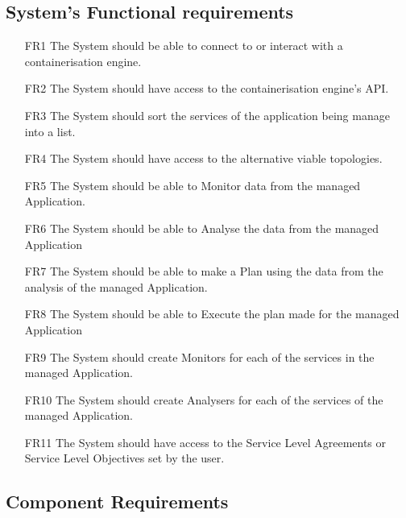 \subsection{{System's Functional requirements}}
\begin{itemize}
    \item [FR1] The System should be able to connect to or interact with a containerisation engine.
    \item [FR2] The System should have access to the containerisation engine's API.
    \item [FR3] The System should sort the services of the application being manage into a list.
    \item [FR4] The System should have access to the alternative viable topologies.
    \item [FR5] The System should be able to Monitor data from the managed Application.
     \item [FR6] The System should be able to Analyse the data from the managed Application
     \item [FR7] The System should be able to make a Plan using the data from the analysis of the managed Application.
     \item [FR8] The System should be able to Execute the plan made for the managed Application
    \item [FR9] The System should create Monitors for each of the services in the managed Application.
    \item [FR10] The System should create Analysers for each of the services of the managed Application.
     \item [FR11] The System should have access to the Service Level Agreements or Service Level Objectives set by the user.
\end{itemize}

\subsection{Component Requirements}

